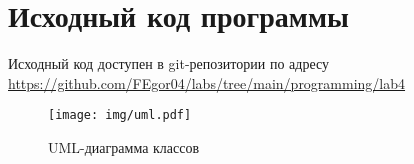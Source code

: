 \section{Исходный код программы}
Исходный код доступен в git-репозитории по адресу \url{https://github.com/FEgor04/labs/tree/main/programming/lab4}

\begin{figure}[ht]
    \centering
    \texttt{[image: img/uml.pdf]}
    \caption[]{UML-диаграмма классов}
\end{figure}